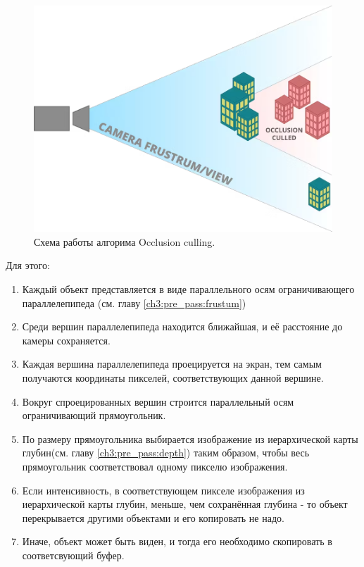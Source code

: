 		\begin{figure}[ht!] 
			\center
			\includegraphics [scale=0.27] {my_folder/images//occlusion_culling}	
			\caption{Схема работы алгорима Occlusion culling.} 
			\label{fig:occlusion_culling}
		\end{figure}
		
		Для этого:
		\begin{enumerate}[1.]
			\item Каждый объект представляется в виде параллельного осям ограничивающего параллелепипеда (см. главу \ref{ch3:pre_pass:frustum})
		 	\item Среди вершин параллелепипеда находится ближайшая, и её расстояние до камеры сохраняется.
		 	\item Каждая вершина параллелепипеда проецируется на экран, тем самым получаются координаты пикселей, соответствующих данной вершине.
		 	\item Вокруг спроецированных вершин строится параллельный осям ограничивающий прямоугольник.
		 	\item По размеру прямоугольника выбирается изображение из иерархической карты глубин(см. главу \ref{ch3:pre_pass:depth}) таким образом, чтобы весь прямоугольник соответствовал одному пикселю изображения.
		 	\item Если интенсивность, в соответствующем пикселе изображения из иерархической карты глубин, меньше, чем сохранённая глубина - то объект перекрывается другими объектами и его копировать не надо. 
		 	\item Иначе, объект может быть виден, и тогда его необходимо скопировать в соответсвующий буфер. 
		\end{enumerate}
		

